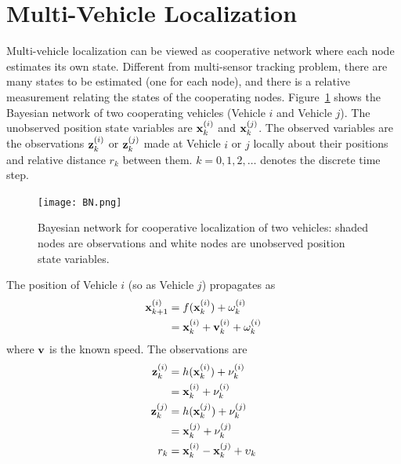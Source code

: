 \section{Multi-Vehicle Localization}

Multi-vehicle localization can be viewed as cooperative network where each node estimates its own state. Different from multi-sensor tracking problem, there are many states to be estimated (one for each node), and there is a relative measurement relating the states of the cooperating nodes. Figure~\ref{fig:BN} shows the Bayesian network of two cooperating vehicles (Vehicle $i$ and Vehicle $j$). The unobserved position state variables are ${\bf x}_k^{(i)}$ and ${\bf x}^{(j)}_k$. The observed variables are the observations ${\bf z}_k^{(i)}$ or ${\bf z}_k^{(j)}$ made at Vehicle $i$ or $j$ locally about their positions and relative distance $r_k$ between them. $k=0,1,2,\dots$ denotes the discrete time step.
\begin{figure}[htbp]
  \centering
    \texttt{[image: BN.png]}
      \caption{Bayesian network for cooperative localization of two vehicles: shaded nodes are observations and white nodes are unobserved position state variables.}
      \label{fig:BN}
\end{figure}

The position of Vehicle $i$ (so as Vehicle $j$) propagates as
\begin{equation}
\begin{split}
{\bf x}^{(i)}_{k+1}&=f({\bf x}^{(i)}_{k})+{\bf \omega}^{(i)}_{k} \\
&={\bf x}^{(i)}_{k}+{\bf v}^{(i)}_k+{\bf \omega}^{(i)}_{k}
\end{split}
\label{eq:mvlpropagation}
\end{equation}
where ${\bf v}$ is the known speed. The observations are
\begin{equation}
\begin{split}
{\bf z}^{(i)}_{k}&=h({\bf x}^{(i)}_{k})+{\bf \nu}^{(i)}_{k}\\
&={\bf x}^{(i)}_{k}+{\bf\nu}^{(i)}_{k}\\
{\bf z}^{(j)}_{k}&=h({\bf x}^{(j)}_{k})+{\bf \nu}^{(j)}_{k}\\
&={\bf x}^{(j)}_{k}+{\bf\nu}^{(j)}_{k}\\
r_{k}&={\bf x}^{(i)}_{k}-{\bf x}^{(j)}_{k}+\upsilon_{k}\\
\end{split}
\label{eq:mvlmeasurement}
\end{equation}

